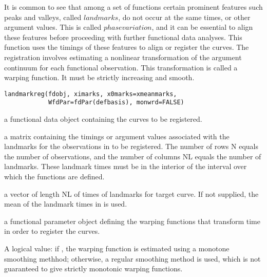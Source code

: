 \documentclass{article}
\begin{document}
\begin{Description}\relax
It is common to see that among a set of functions certain prominent
features such peaks and valleys, called $landmarks$, do not occur
at the same times, or other
argument values.  This is called $phase variation$, and it can be
essential to align these features before proceeding with further
functional data analyses.  This function uses the timings of these
features to align or register the curves.  The registration involves
estimating a nonlinear transformation of the argument continuum for each
functional observation.  This transformation is called a warping
function. It must be strictly increasing and smooth.
\end{Description}
\begin{Usage}
\begin{verbatim}
landmarkreg(fdobj, ximarks, x0marks=xmeanmarks,
            WfdPar=fdPar(defbasis), monwrd=FALSE)
\end{verbatim}
\end{Usage}
\begin{Arguments}
\begin{ldescription}
\item[\code{fdobj}] a functional data object containing the curves to be registered.

\item[\code{ximarks}] a matrix containing the timings or argument values associated with the
landmarks for the observations in  to be registered.  The
number of rows N
equals the number of observations, and the number of columns NL equals the
number of landmarks. These landmark times must be in the interior of the
interval over which the functions are defined.

\item[\code{x0marks}] a vector of length NL of times of landmarks for target curve.  If
not supplied, the mean of the landmark times in 
is used.

\item[\code{WfdPar}] a functional parameter object defining the warping functions
that transform time in order to register the curves.

\item[\code{monwrd}] A logical value:
if , the warping function is estimated using a monotone
smoothing methhod; otherwise, a regular smoothing method is used,
which is not guaranteed to give strictly monotonic warping
functions.

\end{ldescription}
\end{Arguments}
\end{document}
